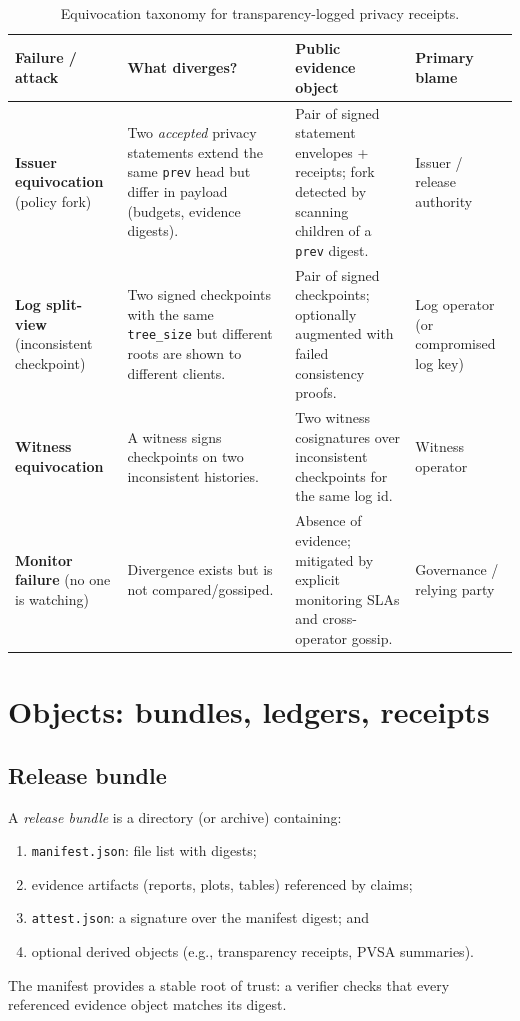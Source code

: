 \documentclass[11pt]{article}
\begin{document}
\begin{table}[t]
\centering
\small
\begin{tabular}{@{}p{2.8cm}p{3.3cm}p{4.2cm}p{2.2cm}@{}}
\toprule
\textbf{Failure / attack} & \textbf{What diverges?} & \textbf{Public evidence object} & \textbf{Primary blame} \\
\midrule
\textbf{Issuer equivocation} (policy fork) & Two \emph{accepted} privacy statements extend the same \texttt{prev} head but differ in payload (budgets, evidence digests). & Pair of signed statement envelopes + receipts; fork detected by scanning children of a \texttt{prev} digest. & Issuer / release authority \\
\addlinespace
\textbf{Log split-view} (inconsistent checkpoint) & Two signed checkpoints with the same \texttt{tree\_size} but different roots are shown to different clients. & Pair of signed checkpoints; optionally augmented with failed consistency proofs. & Log operator (or compromised log key) \\
\addlinespace
\textbf{Witness equivocation} & A witness signs checkpoints on two inconsistent histories. & Two witness cosignatures over inconsistent checkpoints for the same log id. & Witness operator \\
\addlinespace
\textbf{Monitor failure} (no one is watching) & Divergence exists but is not compared/gossiped. & Absence of evidence; mitigated by explicit monitoring SLAs and cross-operator gossip. & Governance / relying party \\
\bottomrule
\end{tabular}
\caption{Equivocation taxonomy for transparency-logged privacy receipts.}
\label{tab:equivocation-taxonomy}
\end{table}

\section{Objects: bundles, ledgers, receipts}
\subsection{Release bundle}
A \emph{release bundle} is a directory (or archive) containing:
\begin{enumerate}[leftmargin=1.4em]
\item \texttt{manifest.json}: file list with digests;
\item evidence artifacts (reports, plots, tables) referenced by claims;
\item \texttt{attest.json}: a signature over the manifest digest; and
\item optional derived objects (e.g., transparency receipts, PVSA summaries).
\end{enumerate}
The manifest provides a stable root of trust: a verifier checks that every referenced evidence object matches its digest.
\end{document}
